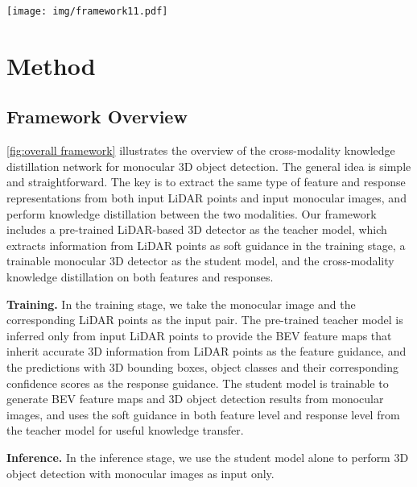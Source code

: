 \documentclass[runningheads]{llncs}
\begin{document}
\begin{figure*}[t]
  \centering
  \texttt{[image: img/framework11.pdf]}
  \caption{Overview of the cross-modality knowledge distillation (CMKD) network for monocular 3D detection. 
  (a) A pre-trained LiDAR-based 3D detector as the teacher model that extracts beneficial information from the LiDAR point data as soft guidance.
  (b) A trainable monocular 3D detector as the student model with the feature-based and response-based knowledge distillation.}
  \label{fig:overall framework}
\end{figure*}

\section{Method}

\subsection{Framework Overview}
\cref{fig:overall framework} illustrates the overview of the cross-modality knowledge distillation network for monocular 3D object detection.
The general idea is simple and straightforward.
The key is to extract the same type of feature and response representations from both input LiDAR points and input monocular images, and perform knowledge distillation between the two modalities.
Our framework includes a pre-trained LiDAR-based 3D detector as the teacher model, which extracts information from LiDAR points as soft guidance in the training stage, a trainable monocular 3D detector as the student model, and the cross-modality knowledge distillation on both features and responses.


\textbf{Training.} In the training stage, we take the monocular image and the corresponding LiDAR points as the input pair. 
The pre-trained teacher model is inferred only from input LiDAR points to provide the BEV feature maps that inherit accurate 3D information from LiDAR points as the feature guidance, and the predictions with 3D bounding boxes, object classes and their corresponding confidence scores as the response guidance. 
The student model is trainable to generate BEV feature maps and 3D object detection results from monocular images, and uses the soft guidance in both feature level and response level from the teacher model for useful knowledge transfer.

\textbf{Inference.} In the inference stage, we use the student model alone to perform 3D object detection with monocular images as input only.
\end{document}
